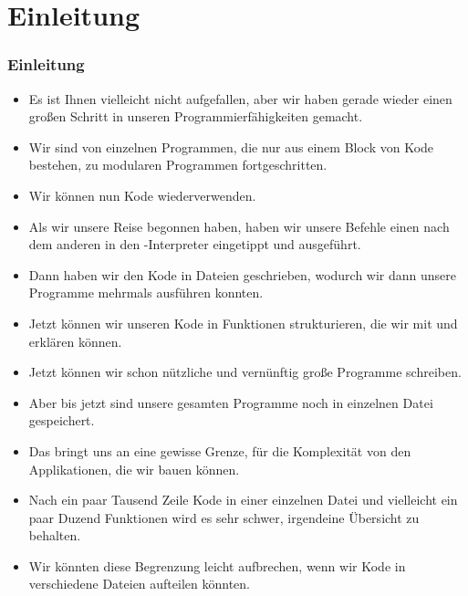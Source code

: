 \documentclass[aspectratio=169,mathserif,notheorems]{beamer}%
\subtitle{27.~Funktionen in Modulen}%
\begin{document}
%
%
\startPresentation%
%
\section{Einleitung}%
\begin{frame}%
\frametitle{Einleitung}%
\begin{itemize}%
%
\item Es ist Ihnen vielleicht nicht aufgefallen, aber wir haben gerade wieder einen großen Schritt in unseren Programmierfähigkeiten gemacht.%
%
\item<2-> Wir sind von einzelnen Programmen, die nur aus einem Block von Kode bestehen, zu modularen Programmen fortgeschritten.%
%
\item<3-> Wir können nun Kode wiederverwenden.%
%
\item<4-> Als wir unsere Reise begonnen haben, haben wir unsere Befehle einen nach dem anderen in den \python-Interpreter eingetippt und ausgeführt.%
%
\item<5-> Dann haben wir den Kode in Dateien geschrieben, wodurch wir dann unsere Programme mehrmals ausführen konnten.%
%
\item<6-> Jetzt können wir unseren Kode in Funktionen strukturieren, die wir mit  und  erklären können.%
%
\item<7-> Jetzt können wir schon nützliche und vernünftig große Programme schreiben.%
%
\item<8-> Aber bis jetzt sind unsere gesamten Programme noch in einzelnen Datei gespeichert.%
%
\item<9-> Das bringt uns an eine gewisse Grenze, für die Komplexität von den Applikationen, die wir bauen können.%
%
\item<10-> Nach ein paar Tausend Zeile Kode in einer einzelnen Datei und vielleicht ein paar Duzend Funktionen wird es sehr schwer, irgendeine Übersicht zu behalten.%
%
\item<11-> Wir könnten diese Begrenzung leicht aufbrechen, wenn wir Kode in verschiedene Dateien aufteilen könnten.%
%
\end{itemize}%
\end{frame}%
%
\end{document}
